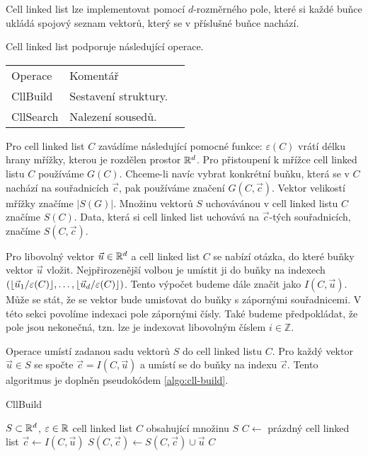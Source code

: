 Cell linked list lze implementovat pomocí $d$-rozměrného pole, které si každé buňce ukládá spojový seznam vektorů, který se v příslušné buňce nachází.

\noindent Cell linked list podporuje následující operace.

\begin{table}[ht!]
  \begin{tabular}{lll}
    Operace & Komentář\\
    CllBuild & Sestavení struktury.\\
    CllSearch & Nalezení sousedů.\\
  \end{tabular}
\end{table}

Pro cell linked list $C$ zavádíme následující pomocné funkce: $\varepsilon(C)$ vrátí délku hrany mřížky, kterou je rozdělen prostor $\mathbb{R}^d$. Pro přistoupení k mřížce cell linked listu $C$ používáme $G(C)$. Chceme-li navíc vybrat konkrétní buňku, která se v $C$ nachází na souřadnicích $\vec{c}$, pak používáme značení $G(C, \vec{c})$. Vektor velikostí mřížky značíme $|S(G)|$. Množinu vektorů $S$ uchovávánou v cell linked listu $C$ značíme $S(C)$. Data, která si cell linked list uchovává na $\vec{c}$-tých souřadnicích, značíme $S(C, \vec{c})$.

Pro libovolný vektor $\vec{u} \in \mathbb{R}^d$ a cell linked list $C$ se nabízí otázka, do které buňky vektor $\vec{u}$ vložit. Nejpřirozenější volbou je umístit ji do buňky na indexech $(\lfloor\vec{u}_1/\varepsilon(C)\rfloor, \ldots, \lfloor\vec{u}_d/\varepsilon(C)\rfloor)$. Tento výpočet budeme dále značit jako $I(C, \vec{u})$. Může se stát, že se vektor bude umisťovat do buňky s zápornými souřadnicemi. V této sekci povolíme indexaci pole zápornými čísly. Také budeme předpokládat, že pole jsou nekonečná, tzn. lze je indexovat libovolným číslem $i \in \mathbb{Z}$.

Operace  umístí zadanou sadu vektorů $S$ do cell linked listu $C$. Pro každý vektor $\vec{u} \in S$ se spočte $\vec{c} = I(C, \vec{u})$ a umístí se do buňky na indexu $\vec{c}$. Tento algoritmus je doplněn pseudokódem \ref{algo:cll-build}.

\begin{algorithm}[ht!]
  \caption{CllBuild}
  \label{algo:cll-build}
  \begin{algorithmic}
    \Require $S \subset \mathbb{R}^d$, $\varepsilon \in \mathbb{R}$
    \Ensure cell linked list $C$ obsahující množinu $S$
    \State $C \leftarrow$ prázdný cell linked list
      \State $\vec{c} \leftarrow I(C, \vec{u})$
      \State $S(C, \vec{c}) \leftarrow S(C, \vec{c}) \cup \vec{u}$
    \EndFor
    \State \Return $C$
  \end{algorithmic}
\end{algorithm}


